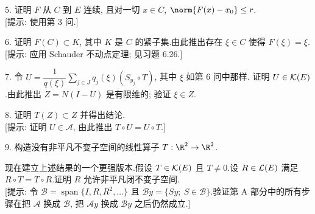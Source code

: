 \begin{problem}
5. 证明 $F$ 从 $C$ 到 $E$ 连续, 且对一切 $x\in C$, $\norm{F(x)-x_0}\le r$.\\
{[提示: 使用第 3 问.]}

6. 证明 $F(C)\subset K$, 其中 $K$ 是 $C$ 的紧子集.由此推出存在 $\xi\in C$ 使得
$F(\xi)=\xi$.\\
{[提示: 应用 Schauder 不动点定理; 见习题 6.26.]}

7. 令 $U=\dfrac{1}{q(\xi)}\sum_{j\in J}q_j(\xi)(S_{y_j}\circ T)$, 其中 $\xi$ 如第 6 问中那样.
证明 $U\in\mathcal{K}(E)$.由此推出 $Z=N(I-U)$ 是有限维的; 验证 $\xi\in Z$.

8. 证明 $T(Z)\subset Z$ 并得出结论.\\
{[提示: 证明 $U\in\mathcal{A}$, 由此推出 $T\circ U=U\circ T$.]}

9. 构造没有非平凡不变子空间的线性算子 $T:\R^2\to\R^2$.


现在建立上述结果的一个更强版本.假设 $T\in\mathcal{K}(E)$ 且 $T\ne0$.设 $R\in\mathcal{L}(E)$ 满足
$R\circ T=T\circ R$.证明 $R$ 允许非平凡闭不变子空间.\\
{[提示: 令 $\mathcal{B}=\operatorname{span}\{I,R,R^2,\dots\}$ 且
$\mathcal{B}y=\{Sy;\ S\in\mathcal{B}\}$.验证第 A 部分中的所有步骤在把 $\mathcal{A}$
换成 $\mathcal{B}$, 把 $\mathcal{A}y$ 换成 $\mathcal{B}y$ 之后仍然成立.]}
\end{problem}

